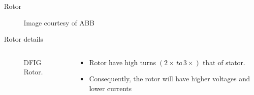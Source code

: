 \documentclass{beamer}
\begin{document}
\begin{frame}{Rotor}

    \begin{figure}
        \centering
        \caption{Image courtesy of ABB}
    \end{figure}    
\end{frame}


\begin{frame}{Rotor details}
  
  \begin{columns}
  
        \begin{column}{0.6\textwidth} %
    \begin{figure}
        \centering
        \caption{\small DFIG Rotor.}
    \end{figure}
    \end{column}
    
    \begin{column}{0.4\textwidth} 
        \begin{itemize}
            \item Rotor have high turns $(2\times\, to \,3\times)$ that of stator.

            \item Consequently, the rotor will have higher voltages and lower currents
        \end{itemize}
    \end{column}

  \end{columns}
\end{frame}
\end{document}
